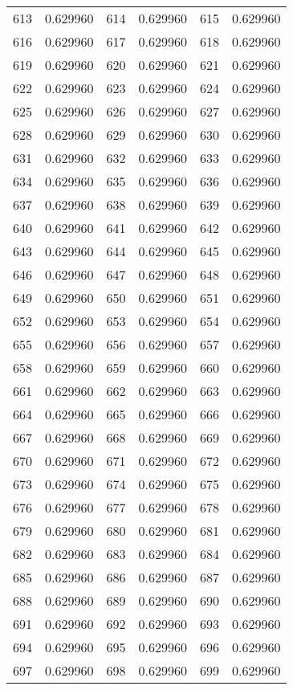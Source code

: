 \documentclass[12pt]{article}
\begin{document}
\begin{longtable}{@{}cc|cc|cc@{}}
613 & 0.629960 & 614 & 0.629960 & 615 & 0.629960 \\
616 & 0.629960 & 617 & 0.629960 & 618 & 0.629960 \\
619 & 0.629960 & 620 & 0.629960 & 621 & 0.629960 \\
622 & 0.629960 & 623 & 0.629960 & 624 & 0.629960 \\
625 & 0.629960 & 626 & 0.629960 & 627 & 0.629960 \\
628 & 0.629960 & 629 & 0.629960 & 630 & 0.629960 \\
631 & 0.629960 & 632 & 0.629960 & 633 & 0.629960 \\
634 & 0.629960 & 635 & 0.629960 & 636 & 0.629960 \\
637 & 0.629960 & 638 & 0.629960 & 639 & 0.629960 \\
640 & 0.629960 & 641 & 0.629960 & 642 & 0.629960 \\
643 & 0.629960 & 644 & 0.629960 & 645 & 0.629960 \\
646 & 0.629960 & 647 & 0.629960 & 648 & 0.629960 \\
649 & 0.629960 & 650 & 0.629960 & 651 & 0.629960 \\
652 & 0.629960 & 653 & 0.629960 & 654 & 0.629960 \\
655 & 0.629960 & 656 & 0.629960 & 657 & 0.629960 \\
658 & 0.629960 & 659 & 0.629960 & 660 & 0.629960 \\
661 & 0.629960 & 662 & 0.629960 & 663 & 0.629960 \\
664 & 0.629960 & 665 & 0.629960 & 666 & 0.629960 \\
667 & 0.629960 & 668 & 0.629960 & 669 & 0.629960 \\
670 & 0.629960 & 671 & 0.629960 & 672 & 0.629960 \\
673 & 0.629960 & 674 & 0.629960 & 675 & 0.629960 \\
676 & 0.629960 & 677 & 0.629960 & 678 & 0.629960 \\
679 & 0.629960 & 680 & 0.629960 & 681 & 0.629960 \\
682 & 0.629960 & 683 & 0.629960 & 684 & 0.629960 \\
685 & 0.629960 & 686 & 0.629960 & 687 & 0.629960 \\
688 & 0.629960 & 689 & 0.629960 & 690 & 0.629960 \\
691 & 0.629960 & 692 & 0.629960 & 693 & 0.629960 \\
694 & 0.629960 & 695 & 0.629960 & 696 & 0.629960 \\
697 & 0.629960 & 698 & 0.629960 & 699 & 0.629960 \\

\end{longtable}
\end{document}
